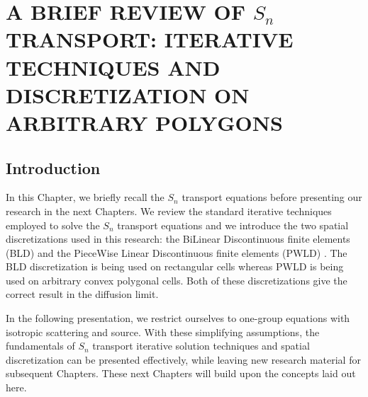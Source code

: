 \chapter{\uppercase{A Brief Review of $S_n$ Transport: Iterative Techniques
and Discretization on Arbitrary Polygons}} \label{spatial_chapter}
\section{Introduction}                      
In this Chapter, we briefly recall the $S_n$ transport equations before presenting 
our research in the next Chapters. We review the standard iterative 
techniques employed to solve the $S_n$ transport equations and we introduce the 
two spatial discretizations used in this research: the BiLinear Discontinuous 
finite elements (BLD) \cite{thick_dgfem,lumping_bld} and the PieceWise Linear 
Discontinuous finite elements (PWLD) \cite{pwld_3d,pwld_2d}. The BLD 
discretization is being used on rectangular cells whereas PWLD is being used 
on arbitrary convex polygonal cells. Both of these discretizations give the 
correct result in the diffusion limit. 

In the following presentation, we restrict ourselves to one-group equations
with isotropic scattering and source. With these simplifying assumptions,
the fundamentals of $S_n$ transport iterative solution techniques and
spatial discretization can be presented effectively, while leaving new
research material for subsequent Chapters. These next Chapters will build
upon the concepts laid out here.
